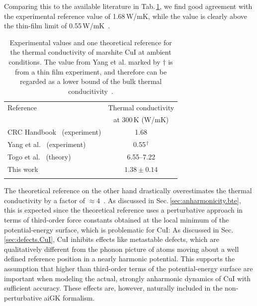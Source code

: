 Comparing this to the available literature in Tab.\,\ref{tab:exp.CuI}, we find good agreement with the  experimental reference value of 1.68\,W/mK, while the value is clearly above the thin-film limit of 0.55\,W/mK~\cite{Yang.2017}.
\begin{table}[ht]
  \centering
  \selectfont
  \begin{tabular}{lc}
    \toprule
    Reference & Thermal conductivity \\
    & at 300\,K (W/mK) \\
    \midrule
    CRC Handbook~\cite{perry2016} (experiment) & 1.68 \\
    Yang et al.~\cite{Yang.2017} (experiment) &  0.55$^{\,\dagger}$ \\
    Togo et al.~\cite{phono3py} (theory) & 6.55--7.22 \\
    This work & $1.38 \pm 0.14$ \\
    \bottomrule
    \vspace{.5em}
  \end{tabular}
  \caption{Experimental values and one theoretical reference for the thermal conductivity of marshite CuI at ambient conditions. The value from Yang et al. marked by $\dagger$ is from a thin film experiment, and therefore can be regarded as a lower bound of the bulk thermal conducitivity~\cite{Yang.2017}.}
  \label{tab:exp.CuI}
\end{table}
The theoretical reference on the other hand drastically overestimates the thermal conductivity by a factor of $\approx 4$~\cite{phono3py}. 
As discussed in Sec.\,\ref{sec:anharmonicity.bte}, this is expected since the theoretical reference uses a perturbative approach in terms of third-order force constants obtained at the local minimum of the potential-energy surface, which is problematic for CuI: As discussed in Sec.\,\ref{sec:defects.CuI}, CuI inhibits effects like metastable defects, which are qualitatively different from the phonon picture of atoms moving about a well defined reference position in a nearly harmonic potential. This supports the assumption that higher than third-order terms of the potential-energy surface are important when modeling the actual, strongly anharmonic dynamics of CuI with sufficient accuracy. These effects are, however, naturally included in the non-perturbative aiGK formalism.


